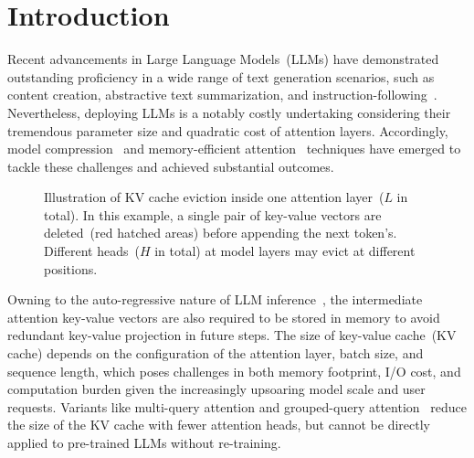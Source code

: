 \section{Introduction}
Recent advancements in Large Language Models~(LLMs) have demonstrated outstanding proficiency in a wide range of text generation scenarios, such as content creation, abstractive text summarization, and instruction-following~\cite{thoppilan2022lamda,wei2022emergent,wang-etal-2023-self-instruct,llama,llama2}. Nevertheless, deploying LLMs is a notably costly undertaking considering their tremendous parameter size and quadratic cost of attention layers. Accordingly, model compression~\cite{frantar2023massive,xia2023sheared} and memory-efficient attention~\cite{dao2022flashattention,dao2023flashattention} techniques have emerged to tackle these challenges and achieved substantial outcomes.

\begin{figure}[t]
    \centering
    \caption{Illustration of KV cache eviction inside one attention layer~($L$ in total). In this example, a single pair of key-value vectors are deleted~(red hatched areas) before appending the next token's. Different heads~($H$ in total) at model layers may evict at different positions.}
	\label{fig:intro}
\end{figure}
Owning to the auto-regressive nature of LLM inference~\cite{vaswani2017attention,radford2019language}, the intermediate attention key-value vectors are also required to be stored in memory to avoid redundant key-value projection in future steps. The size of key-value cache~(KV cache) depends on the configuration of the attention layer, batch size, and sequence length, which poses challenges in both memory footprint, I/O cost, and computation burden given the increasingly upsoaring model scale and user requests. Variants like multi-query attention and grouped-query attention~\cite{mqa,gqa} reduce the size of the KV cache with fewer attention heads, but cannot be directly applied to pre-trained LLMs without re-training. 

